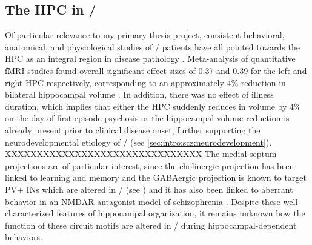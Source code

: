 \subsection{The \acl{HPC} in \scz/}
\label{sec:intro:scz:hpc}
Of particular relevance to my primary thesis project, consistent behavioral, anatomical, and physiological studies of \scz/ patients have all pointed towards the \ac{HPC} as an integral region in disease pathology \citep{Boyer2007, Bogerts1985, Jakob1986}.
Meta-analysis of quantitative \ac{fMRI} studies found overall significant effect sizes of 0.37 and 0.39 for the left and right \ac{HPC} respectively, corresponding to an approximately 4\% reduction in bilateral hippocampal volume \citep{Nelson1998}.
In addition, there was no effect of illness duration, which implies that either the \ac{HPC} suddenly reduces in volume by 4\% on the day of first-episode psychosis or the hippocampal volume reduction is already present prior to clinical disease onset, further supporting the neurodevelopmental etiology of \scz/ (see \autoref{sec:intro:scz:neurodevelopment}). 
XXXXXXXXXXXXXXXXXXXXXXXXXXXXXXX
The medial septum projections are of particular interest, since the cholinergic projection has been linked to learning and memory \citep{Parent2004} and the GABAergic projection is known to target \ac{PV}+ \acp{IN} \citep{Freund1988} which are altered in \scz/ (see ) and it has also been linked to aberrant behavior in an \ac{NMDAR} antagonist model of schizophrenia \citep{Ma2012}.
Despite these well-characterized features of hippocampal organization, it remains unknown how the function of these circuit motifs are altered in \scz/ during hippocampal-dependent behaviors.

